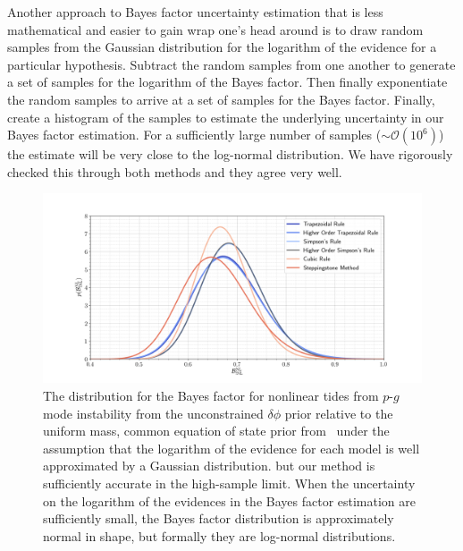 Another approach to Bayes factor uncertainty estimation that is less mathematical and easier to gain wrap one's head around is to draw random samples from the Gaussian distribution for the logarithm of the evidence for a particular hypothesis. Subtract the random samples from one another to generate a set of samples for the logarithm of the Bayes factor. Then finally exponentiate the random samples to arrive at a set of samples for the Bayes factor. Finally, create a histogram of the samples to estimate the underlying uncertainty in our Bayes factor estimation. For a sufficiently large number of samples ($\sim \mathcal{O}(10^6)$) the estimate will be very close to the log-normal distribution. We have rigorously checked this through both methods and they agree very well.

\begin{figure}[th]
\centering
\includegraphics[width=0.9\columnwidth]{figs/chapter6/multi_temper_bayes_lsc_sim_uni_ceos.png}
\caption{The distribution for the Bayes factor for nonlinear tides from $p$-$g$ mode instability from the unconstrained $\delta \phi$ prior relative to the uniform mass, common equation of state prior from~\cite{de2018tidal} under the assumption that the logarithm of the evidence for each model is well approximated by a Gaussian distribution.  but our method is sufficiently accurate in the high-sample limit. When the uncertainty on the logarithm of the evidences in the Bayes factor estimation are sufficiently small, the Bayes factor distribution is approximately normal in shape, but formally they are log-normal distributions.}
\label{fig:lvc_sim_uni_ceos_bayes_distr}
\end{figure}

